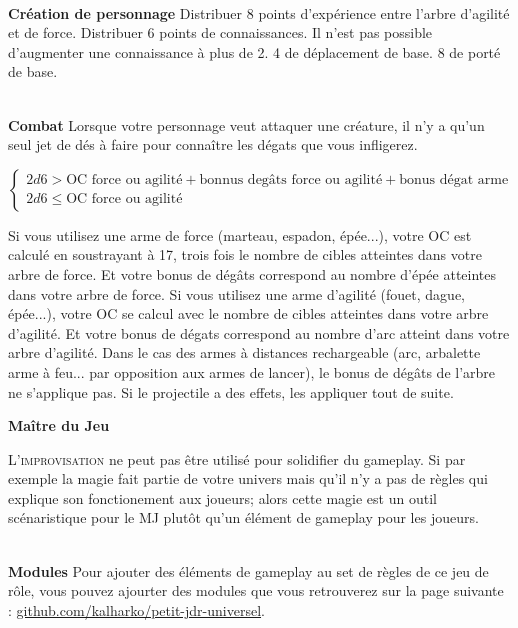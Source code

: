 \documentclass[11pt]{article} %
\newcommand{\enluminure}[2]{\lettrine[lines=3]{\small \initfamily #1}{#2}}
\newcommand{\myjump}[1][1]{\mbox{}\\[#1cm]}
\begin{document}
\myjump[0.5]
\textbf{Création de personnage}\newline
Distribuer 8 points d'expérience entre l'arbre d'agilité et de force. Distribuer 6 points de connaissances. Il n'est pas possible d'augmenter une connaissance à plus de 2. 4 de déplacement de base. 8 de porté de base.

\myjump[0]
\textbf{Combat}\newline
Lorsque votre personnage veut attaquer une créature, il n'y a qu'un seul jet de dés à faire pour connaître les dégats que vous infligerez.

$$
\left\{
    \begin{array}{ll}
        2d6 > \mbox{OC force ou agilité} + \mbox{bonnus degâts force ou agilité} + \mbox{bonus dégat arme}\\
2d6 \leq \mbox{OC force ou agilité}
    \end{array}
\right.
$$

\noindent Si vous utilisez une arme de force (marteau, espadon, épée...), votre OC est calculé en soustrayant à 17, trois fois le nombre de cibles atteintes dans votre arbre de force. Et votre bonus de dégâts correspond au nombre d'épée atteintes dans votre arbre de force.\newline
Si vous utilisez une arme d'agilité (fouet, dague, épée...), votre OC se calcul avec le nombre de cibles atteintes dans votre arbre d'agilité. Et votre bonus de dégats correspond au nombre d'arc atteint dans votre arbre d'agilité.\newline
Dans le cas des armes à distances rechargeable (arc, arbalette arme à feu... par opposition aux armes de lancer), le bonus de dégâts de l'arbre ne s'applique pas. Si le projectile a des effets, les appliquer tout de suite.










\newpage
\textbf{\huge Maître du Jeu}

\enluminure{L}{'improvisation} ne peut pas être utilisé pour solidifier du gameplay. Si par exemple la magie fait partie de votre univers mais qu'il n'y a pas de règles qui explique son fonctionement aux joueurs; alors cette magie est un outil scénaristique pour le MJ plutôt qu'un élément de gameplay pour les joueurs.

\myjump[0]
\textbf{Modules}\newline
\noindent Pour ajouter des éléments de gameplay au set de règles de ce jeu de rôle, vous pouvez ajourter des modules que vous retrouverez sur la page suivante : \href{https://github.com/kalharko/petit-jdr-universel}{github.com/kalharko/petit-jdr-universel}.
\end{document}
